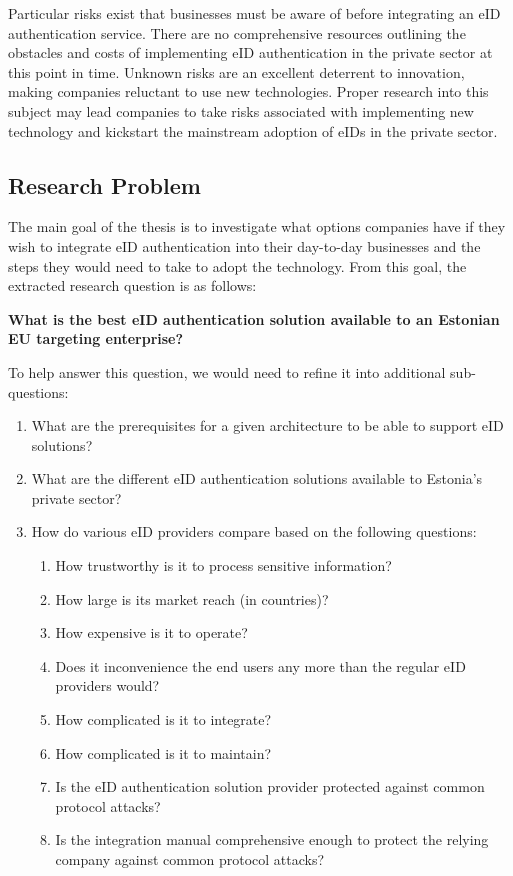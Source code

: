 Particular risks exist that businesses must be aware of before integrating an eID authentication service. There are no comprehensive resources outlining the obstacles and costs of implementing eID authentication in the private sector at this point in time. Unknown risks are an excellent deterrent to innovation, making companies reluctant to use new technologies. Proper research into this subject may lead companies to take risks associated with implementing new technology and kickstart the mainstream adoption of eIDs in the private sector.

\subsection{Research Problem}

The main goal of the thesis is to investigate what options companies have if they wish to integrate eID authentication into their day-to-day businesses and the steps they would need to take to adopt the technology. From this goal, the extracted research question is as follows:

\textbf{What is the best eID authentication solution available to an Estonian EU targeting enterprise?}

To help answer this question, we would need to refine it into additional sub-questions:

\begin{enumerate}
    \item What are the prerequisites for a given architecture to be able to support eID solutions?
    \item What are the different eID authentication solutions available to Estonia's private sector?
    \item How do various eID providers compare based on the following questions:
          \begin{enumerate}
              \item How trustworthy is it to process sensitive information?
              \item How large is its market reach (in countries)?
              \item How expensive is it to operate?
              \item Does it inconvenience the end users any more than the regular eID providers would?
              \item How complicated is it to integrate?
              \item How complicated is it to maintain?
              \item Is the eID authentication solution provider protected against common protocol attacks?
              \item Is the integration manual comprehensive enough to protect the relying company against common protocol attacks?
          \end{enumerate}
\end{enumerate}

